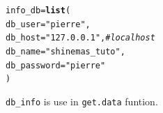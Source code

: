 \documentclass{article}\usepackage[]{graphicx}\usepackage[]{color}
\makeatletter
\newcommand{\hlstr}[1]{\textcolor[rgb]{0.192,0.494,0.8}{#1}}%
\newcommand{\hlcom}[1]{\textcolor[rgb]{0.678,0.584,0.686}{\textit{#1}}}%
\newcommand{\hlstd}[1]{\textcolor[rgb]{0.345,0.345,0.345}{#1}}%
\newcommand{\hlkwb}[1]{\textcolor[rgb]{0.69,0.353,0.396}{#1}}%
\newcommand{\hlkwc}[1]{\textcolor[rgb]{0.333,0.667,0.333}{#1}}%
\newcommand{\hlkwd}[1]{\textcolor[rgb]{0.737,0.353,0.396}{\textbf{#1}}}%
\newenvironment{kframe}{%
 \def\at@end@of@kframe{}%
 \ifinner\ifhmode%
  \def\at@end@of@kframe{\end{minipage}}%
  \begin{minipage}{\columnwidth}%
 \fi\fi%
 \def\FrameCommand##1{\hskip\@totalleftmargin \hskip-\fboxsep
 \colorbox{shadecolor}{##1}\hskip-\fboxsep
     \hskip-\linewidth \hskip-\@totalleftmargin \hskip\columnwidth}%
 \MakeFramed {\advance\hsize-\width
   \@totalleftmargin\z@ \linewidth\hsize
   \@setminipage}}%
 {\par\unskip\endMakeFramed%
 \at@end@of@kframe}
\newenvironment{knitrout}{}{} %
\makeatother
\begin{document}
\begin{appendices}
\begin{knitrout}
\color{fgcolor}\begin{kframe}
\begin{alltt}
\hlstd{info_db} \hlkwb{=} \hlkwd{list}\hlstd{(}
        \hlkwc{db_user} \hlstd{=} \hlstr{"pierre"}\hlstd{,}
        \hlkwc{db_host} \hlstd{=} \hlstr{"127.0.0.1"}\hlstd{,} \hlcom{# localhost}
        \hlkwc{db_name} \hlstd{=} \hlstr{"shinemas_tuto"}\hlstd{,}
        \hlkwc{db_password} \hlstd{=} \hlstr{"pierre"}
        \hlstd{)}
\end{alltt}
\end{kframe}
\end{knitrout}

\texttt{db\_info} is use in \texttt{get.data} funtion.






\newpage



\newpage



\newpage

\end{appendices}
\end{document}
